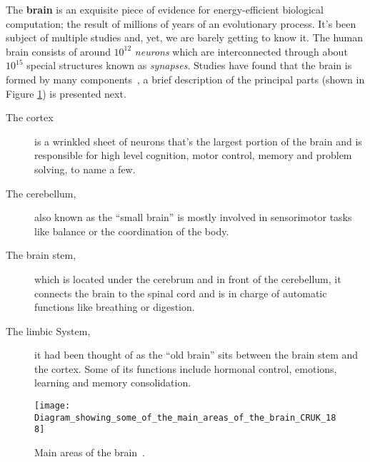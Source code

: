 
The \textbf{brain} is an exquisite piece of evidence for energy-efficient biological computation; the result of millions of years of an evolutionary process. It's been subject of multiple studies and, yet, we are barely getting to know it. The human brain consists of around $10^{12}$ \emph{neurons} which are interconnected through about $10^{15}$ special structures known as \emph{synapses}.
Studies have found that the brain is formed by many components~\cite{thompson2000brain}, a brief description of the principal parts (shown in Figure \ref{fig:brain:components}) is presented next. 
\begin{description}
  \item[The cortex] is a wrinkled sheet of neurons that's the largest portion of the brain and is responsible for high level cognition, motor control, memory and problem solving, to name a few.
  \item[The cerebellum,] also known as the ``small brain'' is mostly involved in sensorimotor tasks like balance or the coordination of the body.
  \item[The brain stem,] which is located under the cerebrum and in front of the cerebellum, it connects the brain to the spinal cord and is in charge of automatic functions like breathing or digestion.
  \item[The limbic System,] it had been thought of as the ``old brain'' sits between the brain stem and the cortex. Some of its functions include hormonal control, emotions, learning and memory consolidation. 
\end{description}

\begin{figure}[hbt]
  \begin{center}
    \texttt{[image: Diagram\_showing\_some\_of\_the\_main\_areas\_of\_the\_brain\_CRUK\_188]}
    \caption{Main areas of the brain~\cite{wikipedia-images}.}
    \label{fig:brain:components}
  \end{center}
  
\end{figure}

